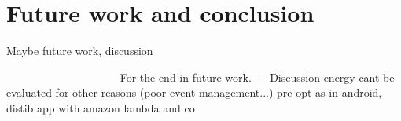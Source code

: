 \documentclass[a4paper,12pt,twoside]{../includes/ThesisStyle}
\begin{document}
\fi

\chapter{Future work and conclusion}
\label{chap:conclusion}
\minitoc

Maybe future work, discussion


------------------------------
For the end in future work.----
Discussion energy cant be evaluated for other reasons (poor event management...) pre-opt as in android, distib app with amazon lambda and co

\ifx\wholebook\relax\else
    
\end{document}
